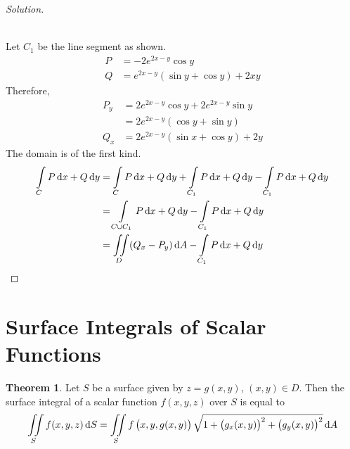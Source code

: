 \documentclass[fleqn, a4paper, 12pt]{article}
\theoremstyle{definition}
\theoremstyle{theorem}
\newtheorem{theorem}{Theorem}
\theoremstyle{remark}
\newenvironment{solution}
{\begin{proof}[Solution]\let\qed\relax}
	{\end{proof}}
\begin{document}
\begin{solution}
	~\\
	\\
	Let $C_1$ be the line segment as shown.
	\begin{align*}
		P &= -2e^{2x - y} \cos y\\
		Q &= e^{2x - y} (\sin y + \cos y) + 2xy
	\end{align*}
	Therefore,
	\begin{align*}
		P_y &= 2e^{2x - y} \cos y + 2e^{2x - y} \sin y \\
		&= 2 e^{2x - y} (\cos y + \sin y)\\
		Q_x &= 2e^{2x - y} (\sin x + \cos y) + 2y
	\end{align*}
	The domain is of the first kind.
	\begin{align*}
		\int\limits_{C} P \dif x + Q \dif y &= \int\limits_{C} P \dif x + Q \dif y + \int\limits_{C_1} P \dif x + Q \dif y - \int\limits_{C_1} P \dif x + Q \dif y\\
		&= \int\limits_{C \cup C_1} P \dif x + Q \dif y - \int\limits_{C_1} P \dif x + Q \dif y\\
		&= \iint\limits_{D} (Q_x - P_y) \dif A - \int\limits_{C_1} P \dif x + Q \dif y
	\end{align*}
\end{solution}

\section{Surface Integrals of Scalar Functions}

\begin{theorem}
	Let $S$ be a surface given by $z = g(x,y)$, $(x,y) \in D$. Then the surface integral of a scalar function $f(x,y,z)$ over $S$ is equal to
	\begin{equation*}
		\iint\limits_{S} f(x,y,z) \dif S = \iint\limits_{S} f \left( x,y,g(x,y) \right) \sqrt{1 + \left( g_x(x,y) \right)^2 + \left( g_y(x,y) \right)^2} \dif A
	\end{equation*}
\end{theorem}
\end{document}
